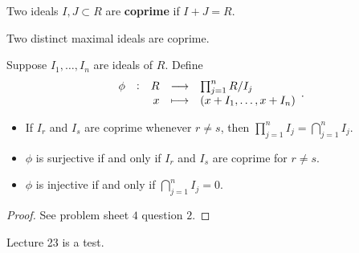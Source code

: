 \begin{definition}
Two ideals $ I, J \subset R $ are \textbf{coprime} if $ I + J = R $.
\end{definition}

\begin{example*}
Two distinct maximal ideals are coprime.
\end{example*}

\pagebreak

Suppose $ I_1, \dots, I_n $ are ideals of $ R $. Define
$$ \function[\phi]{R}{\prod_{j = 1}^n R / I_j}{x}{\br{x + I_1, \dots, x + I_n}}. $$

\begin{lemma}
\label{lem:13.18}
\hfill
\begin{itemize}
\item If $ I_r $ and $ I_s $ are coprime whenever $ r \ne s $, then $ \prod_{j = 1}^n I_j = \bigcap_{j = 1}^n I_j $.
\item $ \phi $ is surjective if and only if $ I_r $ and $ I_s $ are coprime for $ r \ne s $.
\item $ \phi $ is injective if and only if $ \bigcap_{j = 1}^n I_j = 0 $.
\end{itemize}
\end{lemma}

\begin{proof}
See problem sheet $ 4 $ question $ 2 $.
\end{proof}


Lecture 23 is a test.


